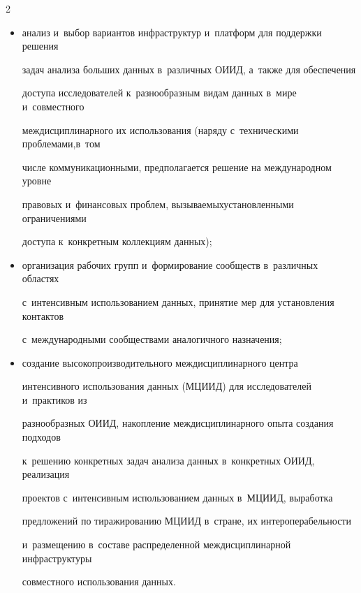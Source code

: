 \begin{multicols}{2}
  \begin{itemize}


\item анализ и~выбор вариантов инфраструктур и~платформ для поддержки решения 


задач анализа больших данных в~различных \mbox{ОИИД}, а~так\-же для обеспечения 


доступа исследователей к~разнообразным видам данных \mbox{в~мире} и~совместного 


междисциплинарного их исполь\-зования (наряду с~техническими проблемами,\linebreak в~том 


числе коммуникационными, предполагается решение на международном уровне 


правовых и~финансовых проблем, вызываемых\linebreak установленными ограничениями 


доступа к~конкретным коллекциям данных);


\item организация рабочих групп и~формирование сообществ в~различных областях 


с~интенсивным использованием данных, принятие мер для установления контактов 


с~международными сообществами аналогичного назначения;


\item создание высокопроизводительного междисциплинарного центра 


интенсивного использования данных (МЦИИД) для исследователей и~практиков из 


разнообразных ОИИД, накопление междисциплинарного опыта создания подходов 


к~решению конкретных задач анализа данных в~конкретных ОИИД, реализация 


проектов с~интенсивным использованием данных в~МЦИИД, выработка 


предложений по тиражированию МЦИИД в~стране, их интероперабельности 


и~размещению в~составе распределенной междисциплинарной инфраструктуры 


совместного использования данных.


\end{itemize}








{\small\frenchspacing


}
\end{multicols}
